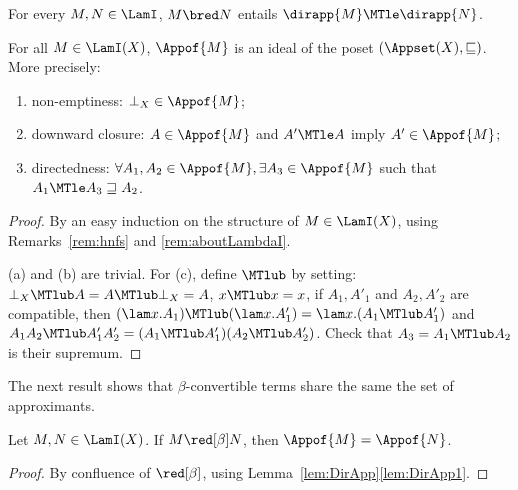 \setcounter{lem:DirApp}{\thetheorem}
\begin{lemma}\label{lem:DirApp}\mbox{}
\bsub
\item\label{lem:DirApp1} 
	For every $M,N\in\LamI$, $M\bred N$ entails  $\dirapp{M} \MTle \dirapp{N}$.
\item\label{lem:DirApp2} 
	For all $M\in\LamI(X)$, $\Appof{M}$ is an ideal of the poset $(\Appset(X),\sqsubseteq)$. More precisely:
	\begin{enumerate}
	\item
		non-emptiness: $\bot_X\in \Appof{M}$;
	\item
		downward closure: $A\in \Appof{M}$ and $A'\MTle A$ imply $A'\in\Appof{M}$;
	\item
		directedness: $\forall A_1,A_2\in\Appof{M},\exists A_3\in\Appof{M}$ such that $A_1\MTle A_3 \sqsupseteq A_2$.
	\end{enumerate}
\esub
\end{lemma}
\begin{proof}
\bsub
\item
By an easy induction on the structure of $M\in\LamI(X)$, using Remarks~\ref{rem:hnfs} and \ref{rem:aboutLambdaI}.
\item (a) and (b) are trivial. 
	For (c), define $\MTlub$ by setting: 
	$\bot_X\MTlub A = A\MTlub \bot_X= A$, $x\MTlub x = x$, 
	if $A_1,A'_1$ and $A_2, A'_2$ are compatible, 
	then $(\lam x.A_1)\MTlub (\lam x.A'_1) = \lam x.(A_1\MTlub A'_1)$ 
	and $A_1A_2\MTlub A'_1A'_2 = (A_1\MTlub A'_1) (A_2\MTlub A'_2)$. 
	Check that $A_3 = A_1 \MTlub A_2$ is their supremum.
\qedhere
\esub
\end{proof}

The next result shows that $\beta$-convertible terms share the same the set of approximants.\par\addvspace{1.5ex}

\noindent\begin{minipage}{\textwidth}
\setcounter{prop:InvariantUnderBeta}{\thetheorem}
\begin{proposition}\label{prop:InvariantUnderBeta}
	Let $M,N\in\LamI(X)$. If $M\red[\beta] N$, then $\Appof{M} = \Appof{N}$.
\end{proposition}

\begin{proof}By confluence of $\red[\beta]$, using Lemma~\ref{lem:DirApp}\eqref{lem:DirApp1}.
\end{proof}
\end{minipage}

